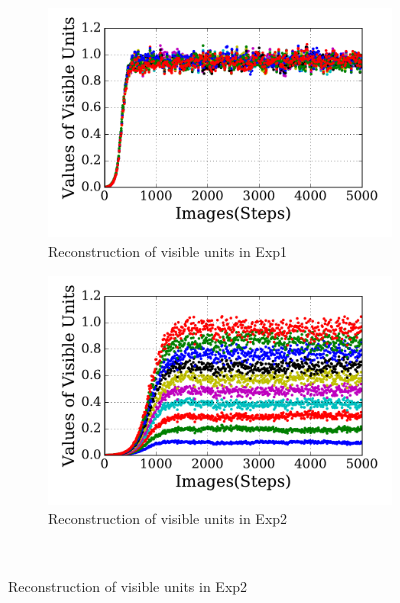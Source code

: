 \begin{figure}
\DIFdelendFL \DIFaddbeginFL \begin{subfigure}[t]{0.48\textwidth}
		\DIFaddendFL \includegraphics[width=\textwidth]{pics_sdlm/21_exp_AE_noise/exp1_recon_s.pdf}
		\caption{Reconstruction of visible units in Exp1}
	\end{subfigure}
	\DIFdelbeginFL %
\DIFdelendFL \DIFaddbeginFL \begin{subfigure}[t]{0.48\textwidth}
		\DIFaddendFL \includegraphics[width=\textwidth]{pics_sdlm/21_exp_AE_noise/exp2_recon_s.pdf}
		\caption{Reconstruction of visible units in Exp2}
	\end{subfigure}\\
	\DIFdelbeginFL %

\end{figure}
